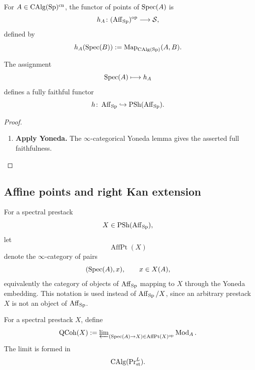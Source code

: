\begin{definition}
\label{def:spectral-functor-of-points}
For $A\in\operatorname{CAlg}(\operatorname{Sp})^{\mathrm{cn}}$, the functor of points of
$\operatorname{Spec}(A)$ is
\[
    h_A
    \colon
    (\operatorname{Aff}_{\operatorname{Sp}})^{\mathrm{op}}
    \longrightarrow
    \mathcal S,
\]
defined by
\[
    h_A(\operatorname{Spec}(B))
    :=
    \operatorname{Map}_{\operatorname{CAlg}(\operatorname{Sp})}(A,B).
\]
\end{definition}

\begin{proposition}
\label{prop:spectral-yoneda-embedding}
The assignment
\[
    \operatorname{Spec}(A)
    \longmapsto
    h_A
\]
defines a fully faithful functor
\[
    h
    \colon
    \operatorname{Aff}_{\operatorname{Sp}}
    \hookrightarrow
    \operatorname{PSh}(\operatorname{Aff}_{\operatorname{Sp}}).
\]
\end{proposition}

\begin{proof}
\leavevmode
\begin{enumerate}[label=\textup{(\arabic*)}]
    \item \textbf{Apply Yoneda.}
    The $\infty$-categorical Yoneda lemma gives the asserted full faithfulness.
\end{enumerate}
\end{proof}

\subsection{Affine points and right Kan extension}

\begin{definition}
\label{def:affine-points-prestack}
For a spectral prestack
\[
    X\in\operatorname{PSh}(\operatorname{Aff}_{\operatorname{Sp}}),
\]
let
\[
    \operatorname{AffPt}(X)
\]
denote the $\infty$-category of pairs
\[
    (\operatorname{Spec}(A),x),
    \qquad
    x\in X(A),
\]
equivalently the category of objects of \(\operatorname{Aff}_{\operatorname{Sp}}\) mapping to \(X\)
through the Yoneda embedding. This notation is used instead of
\(\operatorname{Aff}_{\operatorname{Sp}}/X\), since an arbitrary prestack \(X\) is not an object of
\(\operatorname{Aff}_{\operatorname{Sp}}\).
\end{definition}

\begin{definition}
\label{def:qcoh-spectral-prestack}
For a spectral prestack $X$, define
\[
    \operatorname{QCoh}(X)
    :=
    \varprojlim\nolimits_{(\operatorname{Spec}(A)\to X)
    \in\operatorname{AffPt}(X)^{\mathrm{op}}}
    \operatorname{Mod}_A.
\]
The limit is formed in
\[
    \operatorname{CAlg}(\operatorname{Pr}^L_{\mathrm{st}}).
\]
\end{definition}

